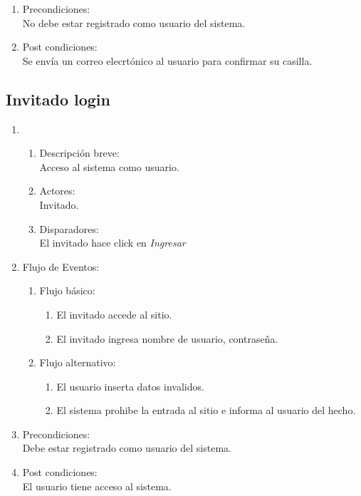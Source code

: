 \documentclass[a4paper,11pt]{article}
\begin{document}
\begin{enumerate}
    \item Precondiciones: \\
        No debe estar registrado como usuario del sistema.

    \item Post condiciones: \\
        Se env\'ia un correo elecrt\'onico al usuario para confirmar su casilla.


\end{enumerate}

\subsection{Invitado login}
\begin{enumerate}

    \item
        \begin{enumerate}
            \item Descripci\'on breve: \\
                Acceso al sistema como usuario.
            \item Actores: \\
                Invitado.
            \item Disparadores: \\
                El invitado hace click en \emph{Ingresar}
        \end{enumerate}

    \item Flujo de Eventos:
        \begin{enumerate}
            \item Flujo b\'asico:
        	\begin{enumerate}
		\item	El invitado accede al sitio.
                \item 	El invitado ingresa nombre de usuario, contrase\~na. 
		\end{enumerate}
            \item Flujo alternativo:\\
		\begin{enumerate}
		\item	El usuario inserta datos invalidos.
		\item 	El sistema prohibe la entrada al sitio e informa al usuario del hecho.
		\end{enumerate}
        \end{enumerate}
        \item Precondiciones: \\
            Debe estar registrado como usuario del sistema.
        \item Post condiciones: \\
            El usuario tiene acceso al sistema.
\end{enumerate}
\end{document}
